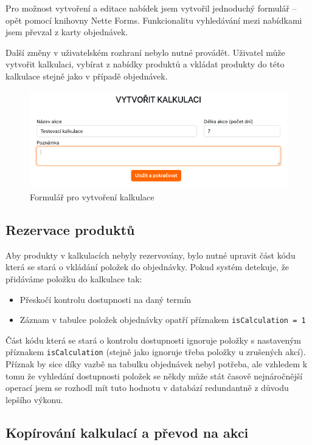 Pro možnost vytvoření a editace nabídek jsem vytvořil jednoduchý formulář -- opět pomocí knihovny Nette Forms. Funkcionalitu vyhledávání mezi nabídkami jsem převzal z karty objednávek.

Další změny v uživatelském rozhraní nebylo nutné provádět. Uživatel může vytvořit kalkulaci, vybírat z nabídky produktů a vkládat produkty do této kalkulace stejně jako v případě objednávek.

\begin{figure}
    \centering
    \includegraphics[width=0.75\linewidth]{kalkulace-formular.png}
    \caption{Formulář pro vytvoření kalkulace}
    \label{fig:enter-label}
\end{figure}

\subsection{Rezervace produktů}

Aby produkty v kalkulacích nebyly rezervovány, bylo nutné upravit část kódu která se stará o vkládání položek do objednávky. Pokud systém detekuje, že přidáváme položku do kalkulace tak:

\begin{itemize}
    \item Přeskočí kontrolu dostupnosti na daný termín
    \item Záznam v tabulce položek objednávky opatří příznakem \lstinline{isCalculation = 1}
\end{itemize}

Část kódu která se stará o kontrolu dostupnosti ignoruje položky s nastaveným příznakem \lstinline{isCalculation} (stejně jako ignoruje třeba položky u zrušených akcí). Příznak by sice díky vazbě na tabulku objednávek nebyl potřeba, ale vzhledem k tomu že vyhledání dostupnosti položek se někdy může stát časově nejnáročnější operací jsem se rozhodl mít tuto hodnotu v databází redundantně z důvodu lepšího výkonu.

\subsection{Kopírování kalkulací a převod na akci}

